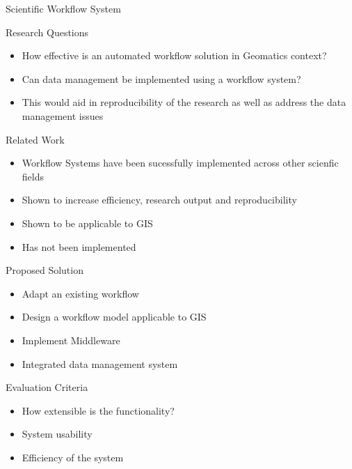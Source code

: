 \documentclass{beamer}
\begin{document}
{\begin{frame}{Scientific Workflow System}
\end{frame}

\begin{frame}{Research Questions}

\begin{itemize}
\item How effective is an automated workflow solution in Geomatics context?
\item Can data management be implemented using a workflow system?
\item This would aid in reproducibility of the research as well
      as address the data management issues
\end{itemize}
\end{frame}



\begin{frame}{Related Work}
\begin{itemize}
\item Workflow Systems have been sucessfully implemented across other scienfic
        fields
\item Shown to increase efficiency, research output and
      reproducibility
\item Shown to be applicable to GIS
\item Has not been implemented
\end{itemize}
\end{frame}


\begin{frame}{Proposed Solution}

\begin{itemize}
\item Adapt an existing workflow
\item Design a workflow model applicable to GIS
\item Implement Middleware
\item Integrated data management system
\end{itemize}
\end{frame}


\begin{frame}{Evaluation Criteria}
\begin{itemize}
\item How extensible is the functionality?
\item System usability
\item Efficiency of the system
\end{itemize}
\end{frame}
}
\end{document}

